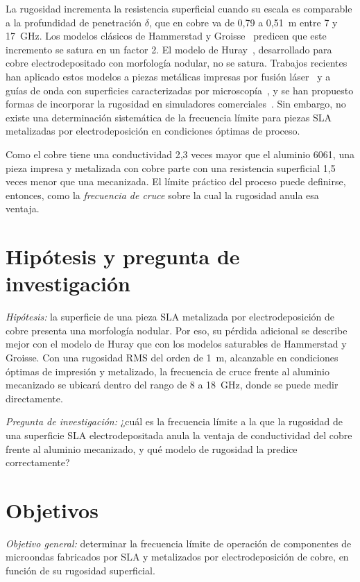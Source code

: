 \documentclass[conference]{IEEEtran}
\begin{document}
La rugosidad incrementa la resistencia superficial cuando su escala es comparable a la profundidad de penetración $\delta$, que en cobre va de 0,79 a 0,51~\textmu m entre 7 y 17~GHz. Los modelos clásicos de Hammerstad y Groisse~\cite{b7,b8} predicen que este incremento se satura en un factor 2. El modelo de Huray~\cite{b9}, desarrollado para cobre electrodepositado con morfología nodular, no se satura. Trabajos recientes han aplicado estos modelos a piezas metálicas impresas por fusión láser~\cite{b5} y a guías de onda con superficies caracterizadas por microscopía~\cite{b6}, y se han propuesto formas de incorporar la rugosidad en simuladores comerciales~\cite{b10,b11}. Sin embargo, no existe una determinación sistemática de la frecuencia límite para piezas SLA metalizadas por electrodeposición en condiciones óptimas de proceso.

Como el cobre tiene una conductividad 2,3 veces mayor que el aluminio 6061, una pieza impresa y metalizada con cobre parte con una resistencia superficial 1,5 veces menor que una mecanizada. El límite práctico del proceso puede definirse, entonces, como la \emph{frecuencia de cruce} sobre la cual la rugosidad anula esa ventaja.

\section{Hipótesis y pregunta de investigación}
\textit{Hipótesis:} la superficie de una pieza SLA metalizada por electrodeposición de cobre presenta una morfología nodular. Por eso, su pérdida adicional se describe mejor con el modelo de Huray que con los modelos saturables de Hammerstad y Groisse. Con una rugosidad RMS del orden de 1~\textmu m, alcanzable en condiciones óptimas de impresión y metalizado, la frecuencia de cruce frente al aluminio mecanizado se ubicará dentro del rango de 8 a 18~GHz, donde se puede medir directamente.

\textit{Pregunta de investigación:} ¿cuál es la frecuencia límite a la que la rugosidad de una superficie SLA electrodepositada anula la ventaja de conductividad del cobre frente al aluminio mecanizado, y qué modelo de rugosidad la predice correctamente?

\section{Objetivos}
\textit{Objetivo general:} determinar la frecuencia límite de operación de componentes de microondas fabricados por SLA y metalizados por electrodeposición de cobre, en función de su rugosidad superficial.
\end{document}
